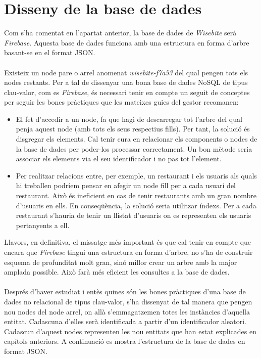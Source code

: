 
\section{Disseny de la base de dades}

Com s'ha comentat en l'apartat anterior, la base de dades de \textit{Wisebite} serà \textit{Firebase}. Aquesta base de dades funciona amb una estructura en forma d'arbre basant-se en el format JSON\cite{json}.
\\\\
Existeix un node pare o arrel anomenat \textit{wisebite-f7a53} del qual pengen tots els nodes restants. Per a tal de dissenyar una bona base de dades NoSQL de tipus clau-valor, com es \textit{Firebase}, és necessari tenir en compte un seguit de conceptes per seguir les bones pràctiques que les mateixes guies del gestor recomanen:
\begin{itemize}
\item El fet d'accedir a un node, fa que hagi de descarregar tot l'arbre del qual penja aquest node (amb tots els seus respectius fills). Per tant, la solució és disgregar els elements. Cal tenir cura en relacionar els components o nodes de la base de dades per poder-los processar correctament. Un bon mètode seria associar els elements via el seu identificador i no pas tot l'element.
\item Per realitzar relacions entre, per exemple, un restaurant i els usuaris als quals hi treballen podríem pensar en afegir un node fill per a cada usuari del restaurant. Això és ineficient en cas de tenir restaurants amb un gran nombre d'usuaris en ells. En conseqüència, la solució seria utilitzar índexs. Per a cada restaurant s'hauria de tenir un llistat d'usuaris on es representen els usuaris pertanyents a ell.
\end{itemize}

\noindent Llavors, en definitiva, el missatge més important és que cal tenir en compte que encara que \textit{Firebase} tingui una estructura en forma d'arbre, no s'ha de construir  esquema de profunditat molt gran, sinó millor crear un arbre amb la major amplada possible. Això farà més eficient les consultes a la base de dades.
\\\\
Després d'haver estudiat i entès quines són les bones pràctiques d'una base de dades no relacional de tipus clau-valor, s'ha dissenyat de tal manera que pengen nou nodes del node arrel, on allà s'emmagatzemen totes les instàncies d'aquella entitat. Cadascuna d'elles serà identificada a partir d'un identificador aleatori. Cadascun d'aquest nodes representen les nou entitats que han estat explicades en capítols anteriors. A continuació es mostra l'estructura de la base de dades en format JSON.

